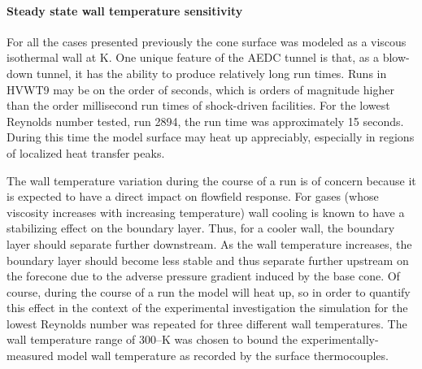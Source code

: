\paragraph{Steady state wall temperature sensitivity}  For all the cases presented previously the cone surface was modeled as a viscous isothermal wall at \unit[300]{K}.  One unique feature of the AEDC tunnel is that, as a blow-down tunnel, it has the ability to produce relatively long run times.  Runs in HVWT9 may be on the order of seconds, which is orders of magnitude higher than the order millisecond run times of shock-driven facilities.  For the lowest Reynolds number tested, run 2894, the run time was approximately 15 seconds.  During this time the model surface may heat up appreciably, especially in regions of localized heat transfer peaks.

The wall temperature variation during the course of a run is of concern because it is expected to have a direct impact on flowfield response.  For gases (whose viscosity increases with increasing temperature) wall cooling is known to have a stabilizing effect on the boundary layer.  Thus, for a cooler wall, the boundary layer should separate further downstream.  As the wall temperature increases, the boundary layer should become less stable and thus separate further upstream on the forecone due to the adverse pressure gradient induced by the base cone.  Of course, during the course of a run the model will heat up, so in order to quantify this effect in the context of the experimental investigation the simulation for the lowest Reynolds number was repeated for three different wall temperatures.  The wall temperature range of 300--\unit[400]{K} was chosen to bound the experimentally-measured model wall temperature as recorded by the surface thermocouples.

